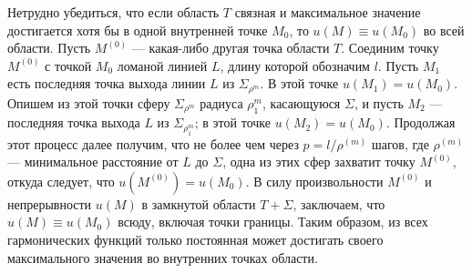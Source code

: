 \begin{qproof}
Нетрудно убедиться, что если область $T$ связная и максимальное значение достигается хотя бы в одной внутренней точке $M_0$, то $u(M) \equiv u(M_0)$ во всей области. Пусть $M^{(0)}$ --- какая-либо другая точка области $T$. Соединим точку $M^{(0)}$ с точкой $M_0$ ломаной линией $L$, длину которой обозначим $l$. Пусть $M_1$ есть последняя точка выхода линии $L$ из $\Sigma_{\rho^m}$. В этой точке $u(M_1) = u(M_0)$. Опишем из этой точки сферу $\Sigma_{\rho^m}$ радиуса $\rho_1^m$, касающуюся $\Sigma$, и пусть $M_2$ --- последняя точка выхода $L$ из $\Sigma_{\rho_1^m}$; в этой точке $u(M_2) = u(M_0)$. Продолжая этот процесс далее получим, что не более чем через $p = l / \rho^{(m)}$ шагов, где $\rho^{(m)}$ --- минимальное расстояние от $L$ до $\Sigma$, одна из этих сфер захватит точку $M^{(0)}$, откуда следует, что $u(M^{(0)}) = u (M_0)$. В силу произвольности $M^{(0)}$ и непрерывности $u(M)$ в замкнутой области $T + \Sigma$, заключаем, что $u(M) \equiv u (M_0)$ всюду, включая точки границы. Таким образом, из всех гармонических функций только постоянная может достигать своего максимального значения во внутренних точках области.
\end{qproof}
